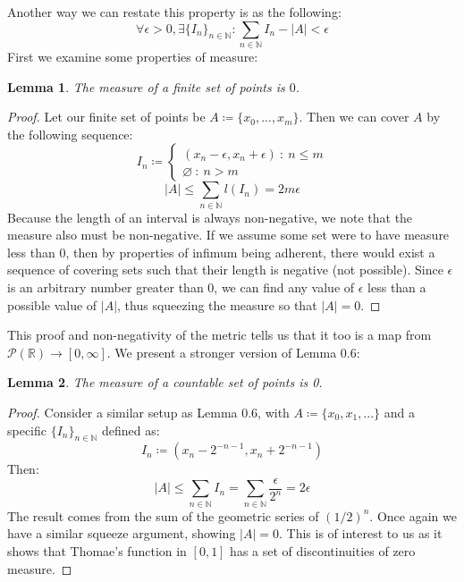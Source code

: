 \documentclass[10pt,letterpaper]{article} %
\newtheorem{lem}{Lemma}[section]
\begin{document}
Another way we can restate this property is as the following:
\begin{equation*}
  \forall \epsilon > 0, \exists \{I_n\}_{n \in \mathbb{N}}: \sum_{n \in \mathbb{N}}I_n - |A| < \epsilon
\end{equation*} 
First we examine some properties of measure:

\begin{lem}
The measure of a finite set of points is $0$.
\end{lem}
\begin{proof}
Let our finite set of points be $A \coloneq \{x_0, ..., x_m\}$. Then we can cover $A$ by the following sequence:
\begin{equation*}
  I_n \coloneq \begin{cases*}
    (x_n - \epsilon, x_n + \epsilon) \ : \ n \leqslant m\\
    \varnothing \ : \ n > m
  \end{cases*}
\end{equation*}
\begin{equation*}
  |A| \leqslant \sum_{n \in \mathbb{N}}l(I_n) = 2m\epsilon
\end{equation*}
Because the length of an interval is always non-negative, we note that the measure also must be non-negative. If we assume some set were to have measure less than $0$, then by properties of infimum being adherent, there would exist a sequence of covering sets such that their length is negative (not possible). Since $\epsilon$ is an arbitrary number greater than $0$, we can find any value of $\epsilon$ less than a possible value of $|A|$, thus squeezing the measure so that $|A| = 0$. 
\end{proof}
This proof and non-negativity of the metric tells us that it too is a map from $\mathcal{P}(\mathbb{R}) \xrightarrow{} [0, \infty]$. We present a stronger version of Lemma 0.6:
\begin{lem}
The measure of a countable set of points is 0.
\end{lem}
\begin{proof}
Consider a similar setup as Lemma 0.6, with $A \coloneq \{x_0, x_1,...\}$ and a specific $\{I_n\}_{n \in \mathbb{N}}$ defined as:
\begin{equation*}
  I_n \coloneq (x_n - 2^{-n-1}, x_n + 2^{-n-1})
\end{equation*}
Then:
\begin{equation*}
  |A| \leqslant \sum_{n \in \mathbb{N}}I_n = \sum_{n \in \mathbb{N}}\frac{\epsilon}{2^n} = 2\epsilon
\end{equation*}
The result comes from the sum of the geometric series of $(1/2)^n$. Once again we have a similar squeeze argument, showing $|A| = 0$. This is of interest to us as it shows that Thomae's function in $[0, 1]$ has a set of discontinuities of zero measure.
\end{proof}
\end{document}
